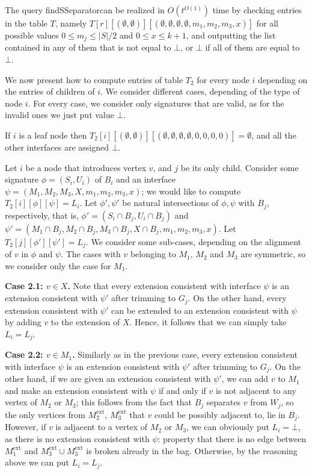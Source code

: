 \documentclass[a4paper,11pt]{article}
\theoremstyle{definition}
\theoremstyle{remark}
\newcommand{\qSsep}{\textnormal{findSSeparator}}
\newcommand{\ext}{\textrm{ext}}
\begin{document}
The query \qSsep can be realized in $O(t^{O(1)})$ time by checking entries
in the table $T$, namely 
$T[r][(\emptyset,\emptyset)][(\emptyset,\emptyset,\emptyset,\emptyset,m_1,m_2,m_3,x)]$
for all possible values $0\leq m_j\leq |S|/2$ and $0\leq x\leq k+1$, and
outputting the list contained in any of them that is not equal to
$\bot$, or $\bot$ if all of them are equal to $\bot$.

We now present how to compute entries of table $T_2$ for every node
$i$ depending on the entries of children of $i$.  We consider
different cases, depending of the type of node $i$.  For every case,
we consider only signatures that are valid, as for the invalid ones we
just put value $\bot$.  

\vskip 0.3cm
 If $i$ is a leaf node then
$T_2[i][(\emptyset,\emptyset)][(\emptyset,\emptyset,\emptyset,\emptyset,0,0,0,0)]=\emptyset$,
and all the other interfaces are assigned $\bot$.  \vskip 0.3cm

 Let $i$ be a node that
introduces vertex $v$, and $j$ be its only child.  Consider some
signature $\phi=(S_i,U_i)$ of $B_i$ and an interface
$\psi=(M_1,M_2,M_3,X,m_1,m_2,m_3,x)$; we would like to compute
$T_2[i][\phi][\psi]=L_i$.  Let $\phi',\psi'$ be natural intersections
of $\phi,\psi$ with $B_j$, respectively, that is, $\phi'=(S_i\cap B_j,
U_i\cap B_j)$ and $\psi'=(M_1\cap B_j,M_2\cap B_j,M_3\cap B_j,X\cap
B_j,m_1,m_2,m_3,x)$.  Let $T_2[j][\phi'][\psi']=L_j$.  We consider
some sub-cases, depending on the alignment of $v$ in $\phi$ and $\psi$.
The cases with $v$ belonging to $M_1$, $M_2$ and $M_3$ are symmetric,
so we consider only the case for $M_1$.

\vskip 0.1cm {\bf{Case 2.1: $v\in X$.}} Note that every extension
consistent with interface $\psi$ is an extension consistent with
$\psi'$ after trimming to $G_j$.  On the other hand, every extension
consistent with $\psi'$ can be extended to an extension consistent
with $\psi$ by adding $v$ to the extension of $X$.  Hence, it follows
that we can simply take $L_i=L_j$.

\vskip 0.1cm {\bf{Case 2.2: $v\in M_1$.}} Similarly as in the previous
case, every extension consistent with interface $\psi$ is an extension
consistent with $\psi'$ after trimming to $G_j$.  On the other hand,
if we are given an extension consistent with $\psi'$, we can add $v$
to $M_1$ and make an extension consistent with $\psi$ if and only if
$v$ is not adjacent to any vertex of $M_2$ or $M_3$; this follows from
the fact that $B_j$ separates $v$ from $W_j$, so the only vertices
from $M^{\ext}_2$, $M^{\ext}_3$ that $v$ could be possibly adjacent
to, lie in $B_j$.  However, if $v$ is adjacent to a vertex of $M_2$ or
$M_3$, we can obviously put $L_i=\bot$, as there is no extension
consistent with $\psi$: property that there is no edge between
$M^{\ext}_1$ and $M^{\ext}_3\cup M^{\ext}_3$ is broken already in the
bag.  Otherwise, by the reasoning above we can put $L_i=L_j$.
\end{document}

